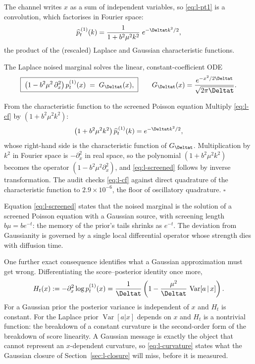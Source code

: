 The channel writes $x$ as a sum of independent variables, so
\eqref{eq:l-pt1} is a convolution, which factorises in Fourier space:
\begin{equation}
  \widehat{p}_t^{\,(1)}(k)
  = \frac{1}{1 + b^2 \mu^2 k^2}\; e^{-\Deltat k^2/2},
  \label{eq:l-cf}
\end{equation}
the product of the (rescaled) Laplace and Gaussian characteristic
functions.

\begin{theorem}\label{thm:l-screened}
The Laplace noised marginal solves the linear, constant-coefficient ODE
\begin{equation}
  \boxed{\;
  \big( 1 - b^2 \mu^2\, \partial_x^2 \big)\, p_t^{(1)}(x)
  \;=\; G_{\Deltat}(x),
  \;}
  \qquad
  G_{\Deltat}(x) = \frac{e^{-x^2/2\Deltat}}{\sqrt{2\pi \Deltat}} .
  \label{eq:l-screened}
\end{equation}
\end{theorem}

\begin{toolbox}{From the characteristic function to the screened Poisson
equation}
Multiply \eqref{eq:l-cf} by $(1 + b^2\mu^2 k^2)$:
\begin{equation*}
  \big( 1 + b^2 \mu^2 k^2 \big)\, \widehat{p}_t^{\,(1)}(k)
  = e^{-\Deltat k^2 / 2},
\end{equation*}
whose right-hand side is the characteristic function of $G_{\Deltat}$.
Multiplication by $k^2$ in Fourier space is $-\partial_x^2$ in real
space, so the polynomial $(1 + b^2\mu^2 k^2)$ becomes the operator
$(1 - b^2\mu^2 \partial_x^2)$, and \eqref{eq:l-screened} follows by
inverse transformation. The audit checks \eqref{eq:l-cf} against direct
quadrature of the characteristic function to $2.9 \times 10^{-6}$, the
floor of oscillatory quadrature. \hfill$\square$
\end{toolbox}

Equation \eqref{eq:l-screened} states that the noised marginal is the
solution of a screened Poisson equation with a Gaussian source, with
screening length $b\mu = b e^{-t}$: the memory of the prior's tails
shrinks as $e^{-t}$. The deviation from Gaussianity is governed by a
single local differential operator whose strength dies with diffusion
time.

One further exact consequence identifies what a Gaussian approximation
must get wrong. Differentiating the score--posterior identity once more,
\begin{equation}
  H_t(x) := -\partial_x^2 \log p_t^{(1)}(x)
  = \frac{1}{\Deltat}
    \left( 1 - \frac{\mu^2}{\Deltat}\, \operatorname{Var}[a \,|\, x] \right).
  \label{eq:l-curvature}
\end{equation}
For a Gaussian prior the posterior variance is independent of $x$ and
$H_t$ is constant. For the Laplace prior $\operatorname{Var}[a|x]$ depends
on $x$ and $H_t$ is a nontrivial function: the breakdown of a constant
curvature is the second-order form of the breakdown of score linearity.
A Gaussian message is exactly the object that cannot represent an
$x$-dependent curvature, so \eqref{eq:l-curvature} states what the
Gaussian closure of Section~\ref{sec:l-closure} will miss, before it is
measured.

